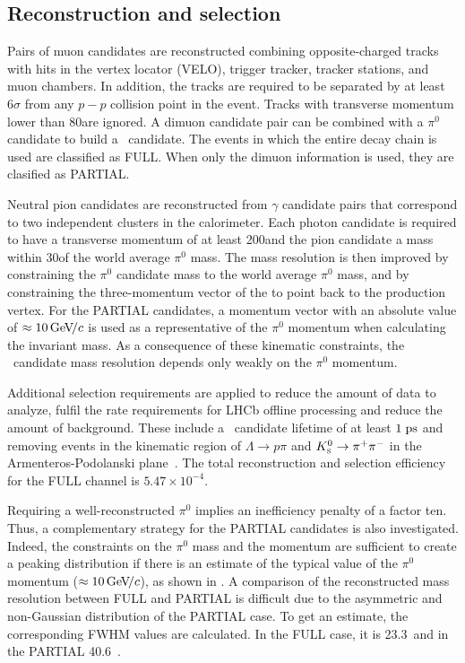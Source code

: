 
\subsection{Reconstruction and selection}
\label{subsec:selection}

Pairs of muon candidates are reconstructed combining opposite-charged tracks with hits in the vertex locator (VELO), trigger tracker, tracker stations, and muon chambers. 
In addition, the tracks are required to be separated by at least $6\sigma$ from any $p-p$ collision point in the event.
Tracks with transverse momentum lower than 80\mevc are ignored. 
A dimuon candidate pair can be combined with a $\pi^0$ candidate to build a \KS\ candidate. 
The events in which the entire decay chain is used are classified as FULL. When only the dimuon information is used, they are clasified as PARTIAL.

Neutral pion candidates are reconstructed from 
$\gamma$ candidate pairs that correspond to two independent clusters in the calorimeter.
Each photon candidate is required to have a transverse momentum of
at least 200\mevc and the pion candidate a mass within 30\mevcc of the world average $\pi^0$ mass.
The mass resolution is then improved by constraining the $\pi^0$ candidate 
mass to the world average $\pi^0$ mass, and by constraining the three-momentum
vector of the \KS to point back to the production vertex. For the PARTIAL candidates, a momentum vector with an absolute value of $\approx 10{\mathrm{\,Ge\kern -0.1em V\!/}c}$
is used as a representative of the $\pi^0$ momentum when calculating the invariant mass. As a consequence of these kinematic constraints, the \KS\ candidate 
mass resolution depends only weakly on the $\pi^{0}$ momentum.

Additional selection requirements are applied to reduce the
amount of data to analyze, fulfil the rate requirements for LHCb offline
processing and reduce the amount of background. These include a \KS\ candidate lifetime of at least $1\;\rm ps$
and removing events in the kinematic region of $\Lambda\to p \pi$ and $K^0_{\mathrm{\scriptscriptstyle S}}\to \pi^{+}\pi^{-}$ in the Armenteros-Podolanski plane~\cite{Armenteros}.
The total reconstruction and selection efficiency for the FULL channel is $5.47\times10^{-4}$.

Requiring a well-reconstructed  $\pi^0$ implies an inefficiency penalty of a factor ten.
Thus, a complementary strategy for the PARTIAL candidates is also investigated.
Indeed, the constraints on the $\pi^0$ mass and the \KS momentum are sufficient to create a peaking distribution if there is an estimate of the typical
value of the $\pi^0$ momentum ($\approx 10{\mathrm{\,Ge\kern -0.1em V\!/}c}$), as shown in .
A comparison of the reconstructed mass resolution between FULL and PARTIAL is difficult due to the asymmetric and non-Gaussian distribution of the PARTIAL case. To get an estimate, the corresponding 
FWHM values are calculated. In the FULL case, it is 23.3~\mevcc and in the PARTIAL 40.6~\mevcc.


